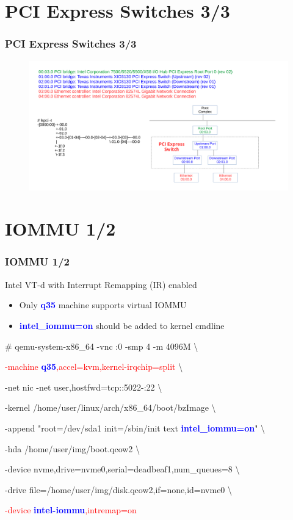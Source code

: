 \documentclass[aspectratio=169]{beamer}
\begin{document}
\section{PCI Express Switches 3/3}
\begin{frame}
\frametitle{PCI Express Switches 3/3}
\begin{figure}
\includegraphics[width=1.0\linewidth]{figures/pcie-switch.pdf}
\end{figure}
\end{frame}


\section{IOMMU 1/2}
\begin{frame}
\frametitle{IOMMU 1/2}
{\LARGE Intel VT-d with Interrupt Remapping (IR) enabled}
\begin{itemize}
\item {\large Only \textbf{\textcolor{blue}{q35}} machine supports virtual IOMMU}
\item {\large \textbf{\textcolor{blue}{intel\_iommu=on}} should be added to kernel cmdline}
\end{itemize}
\begin{block}{}

\# qemu-system-x86\_64 -vnc :0 -smp 4 -m 4096M \textbackslash

\textcolor{red}{-machine \textbf{\textcolor{blue}{q35}},accel=kvm,kernel-irqchip=split} \textbackslash

-net nic -net user,hostfwd=tcp::5022-:22 \textbackslash

-kernel /home/user/linux/arch/x86\_64/boot/bzImage \textbackslash
	
-append "root=/dev/sda1 init=/sbin/init text \textbf{\textcolor{blue}{intel\_iommu=on}}" \textbackslash

-hda /home/user/img/boot.qcow2 \textbackslash

-device nvme,drive=nvme0,serial=deadbeaf1,num\_queues=8 \textbackslash

-drive file=/home/user/img/disk.qcow2,if=none,id=nvme0 \textbackslash

\textcolor{red}{-device \textbf{\textcolor{blue}{intel-iommu}},intremap=on}

\end{block}
\end{frame}
\end{document}
